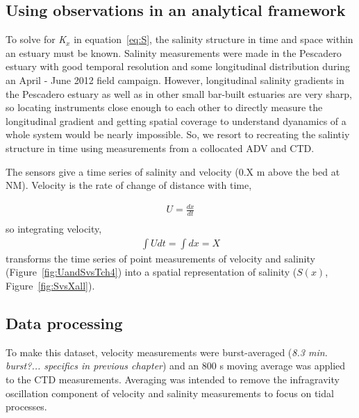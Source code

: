 \subsection{Using observations in an analytical framework} \label{ssec:ObsInto1DAdvDiff}
To solve for \emph{K$_x$} in equation~\ref{eq:S}, the salinity structure in time and space within an estuary must be known. Salinity measurements were made in the Pescadero estuary with good temporal resolution and some longitudinal distribution during an April - June 2012 field campaign. However, longitudinal salinity gradients in the Pescadero estuary as well as in other small bar-built estuaries are very sharp, so locating instruments close enough to each other to directly measure the longitudinal gradient and getting spatial coverage to understand dyanamics of a whole system would be nearly impossible. So, we resort to recreating the salintiy structure in time using measurements from a collocated ADV and CTD. 

The sensors give a time series of salinity and velocity (0.X m above the bed at NM). Velocity is the rate of change of distance with time,

\begin{eqnarray}
U = \frac{dx}{dt} \label{eq:uEdxdt}\\
\end{eqnarray}
so integrating velocity,
\begin{eqnarray}
\int{Udt} = \int{dx} = X \label{eq:intuEx}
\end{eqnarray}
transforms the time series of point measurements of velocity and salinity (Figure~\ref{fig:UandSvsTch4}) into a spatial representation of salinity ($S(x)$, Figure~\ref{fig:SvsXall}).

\subsection{Data processing} \label{ssec:DataProcessing}
To make this dataset, velocity measurements were burst-averaged (\emph{8.3 min. burst?... specifics in previous chapter}) and an 800 s moving average was applied to the CTD measurements.  Averaging was intended to remove the infragravity oscillation component of velocity and salinity measurements to focus on tidal processes. 

